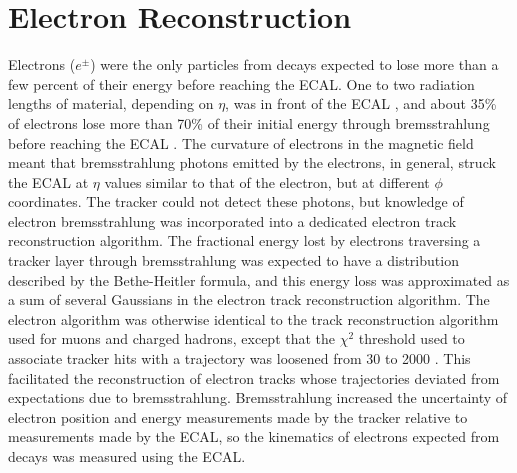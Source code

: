 \section{Electron Reconstruction}
\label{sec:eleReco}
Electrons ($e^{\pm}$) were the only particles from \WR decays expected to lose more than a few percent of their 
energy before reaching the ECAL.  One to two radiation lengths of material, depending on $\eta$, was in front of 
the ECAL \cite{ecalPerformanceInCollisions}, and about 35\% of electrons lose more than 70\% of their initial energy 
through bremsstrahlung before reaching the ECAL \cite{trackerPerformanceInCollisions}.  The curvature of electrons 
in the magnetic field meant that bremsstrahlung photons emitted by the electrons, in general, struck the ECAL 
at $\eta$ values similar to that of the electron, but at different $\phi$ coordinates.  The tracker could not detect 
these photons, but knowledge of electron bremsstrahlung was incorporated into a dedicated electron track reconstruction 
algorithm.  The fractional energy lost by electrons traversing a tracker layer through bremsstrahlung was expected to 
have a distribution described by the Bethe-Heitler formula, and this energy loss was approximated as a sum of 
several Gaussians in the electron track reconstruction algorithm.  The electron algorithm was otherwise identical to 
the track reconstruction algorithm used for muons and charged hadrons, except that the $\chi^{2}$ threshold used to 
associate tracker hits with a trajectory was loosened from 30 to 2000 \cite{trackerPerformanceInCollisions}.  This 
facilitated the reconstruction of electron tracks whose trajectories deviated from expectations due to bremsstrahlung.  
Bremsstrahlung increased the uncertainty of electron position and energy measurements made by the tracker relative to 
measurements made by the ECAL, so the kinematics of electrons expected from \WR decays was measured using the ECAL.

